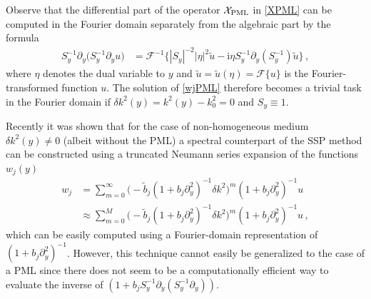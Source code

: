 \documentclass[11pt,a4paper]{article}
\newcommand{\iu}{\mathrm{i}} %
\newcommand{\cX}{\mathcal{X}}
\theoremstyle{plain}%
\theoremstyle{definition}
\theoremstyle{remark}
\begin{document}
Observe that the differential part of the operator $\cX_{\rm PML}$ in \eqref{XPML} can be computed in the Fourier domain separately from the algebraic part by the formula
\begin{equation*}
\begin{split}
    S_y^{-1} \partial_y \bigl( S_y^{-1} \partial_y u \bigr)
        &= \mathcal{F}^{-1}\bigl\{ |S_y|^{-2} |\eta|^2 \tilde{u}
            - \iu \eta S_y^{-1} \partial_y(S_y^{-1}) \tilde{u} \bigr\}\,,
\end{split}
\end{equation*}
where $\eta$ denotes the dual variable to $y$ and $\tilde{u}=\tilde{u}(\eta) = \mathcal{F}\{u\}$ is the Fourier-transformed function $u$. 
%
%
The solution of \eqref{wjPML} therefore becomes a trivial task in the Fourier domain if $\delta k^2(y) = k^2(y) - k_0^2 = 0$ and $S_y \equiv 1$.

Recently it was shown \cite{Daniel1} that for the case of non-homogeneous medium $\delta k^2(y)\neq0$ (albeit without the PML) a spectral counterpart of the SSP method can be constructed using a truncated Neumann series expansion of the functions $w_j(y)$
\begin{equation*}
\begin{aligned}
     w_j &= \sum_{m=0}^{\infty}  \bigl(- \tilde{b}_j(1+b_j\partial_y^2)^{-1}\delta k^2 \bigr)^m (1+ b_j\partial_y^2)^{-1}u \\
    &\approx \sum_{m=0}^{M}  \bigl(- \tilde{b}_j(1 +b_j\partial_y^2)^{-1}\delta k^2 \bigr)^m (1 + b_j\partial_y^2)^{-1}u\,,
\end{aligned}
\end{equation*}
which can be easily computed using a Fourier-domain representation of $(1 + b_j\partial_y^2)^{-1}$. 
However, this technique cannot easily be generalized to the case of a PML since there does not seem to be a computationally efficient way to evaluate the inverse of
 $(1 + b_jS_y^{-1}\partial_y (S_y^{-1} \partial_y))$.
\end{document}
